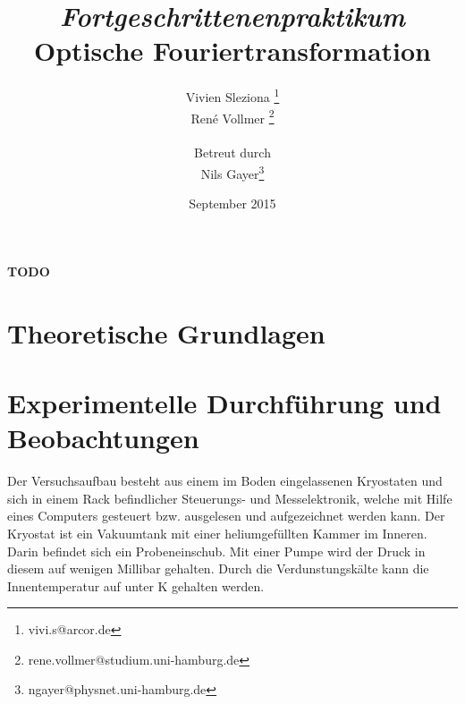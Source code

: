 \documentclass[12pt,a4paper]{article}
\begin{document}
	
	\textbf{TODO}
	
	
	
	\title{\textit{Fortgeschrittenenpraktikum}\\\textbf{Optische Fouriertransformation} }
	\date{September 2015}
	\author{Vivien Sleziona \footnote{vivi.s@arcor.de}\\ René Vollmer \footnote{rene.vollmer@studium.uni-hamburg.de} \\ \\Betreut durch\\ Nils Gayer\footnote{ngayer@physnet.uni-hamburg.de}}
	
	\maketitle
	
	\begin{center} 
		\bigskip
		\bigskip
		
		\begin{minipage}{0.75\textwidth}
			
		\end{minipage}
	\end{center}
	
	\newpage
	
	\tableofcontents
	\vfill
	\newpage
	\clearpage	
	
	
	\section{Theoretische Grundlagen}
	
	

	
	\newpage
	\clearpage
	
	\section{Experimentelle Durchführung und Beobachtungen}
	Der Versuchsaufbau besteht aus einem im Boden eingelassenen Kryostaten und sich in einem Rack befindlicher Steuerungs- und Messelektronik, welche mit Hilfe eines Computers gesteuert bzw. ausgelesen und aufgezeichnet werden kann. Der Kryostat ist ein Vakuumtank mit einer heliumgefüllten Kammer im Inneren. Darin befindet sich ein Probeneinschub. Mit einer Pumpe wird der Druck in diesem auf wenigen Millibar gehalten. Durch die Verdunstungskälte kann die Innentemperatur auf unter \unit[1,5]{K} gehalten werden.
	
\end{document}
